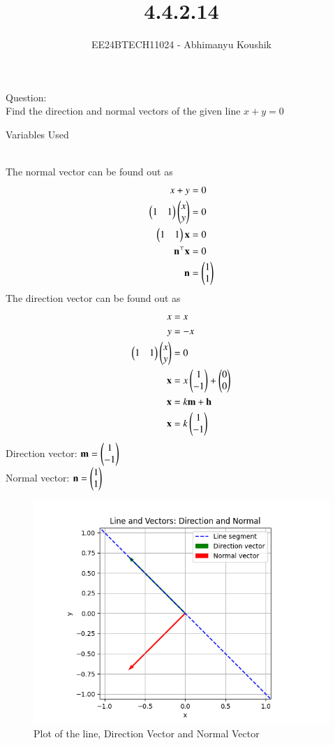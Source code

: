 \documentclass[journal]{IEEEtran}
\begin{document}

\vspace{3cm}

\title{4.4.2.14}
\author{EE24BTECH11024 - Abhimanyu Koushik}
{\let\newpage\relax\maketitle}
Question:\\
Find the direction and normal vectors of the given line $x+y=0$
\begin{table}[h!]    
  \centering
  
  \caption{Variables Used}
  \label{tab1-1.9-6}
\end{table}\\
\solution
The normal vector can be found out as
\begin{align}
x+y&=0\\
\begin{pmatrix}1 & 1\end{pmatrix}\begin{pmatrix}x\\y\end{pmatrix}&=0\\
\begin{pmatrix}1&1\end{pmatrix}\mathbf{x}&=0\\
\mathbf{n}^\top\mathbf{x}&=0\\
\mathbf{n}&=\begin{pmatrix}1\\1\end{pmatrix}
\end{align}
The direction vector can be found out as
\begin{align}
x&=x\\
y&=-x\\
\begin{pmatrix}1 & 1\end{pmatrix}\begin{pmatrix}x\\y\end{pmatrix}&=0\\
\mathbf{x}&=x\begin{pmatrix}1\\-1\end{pmatrix}+\begin{pmatrix}0\\0\end{pmatrix}\\
\mathbf{x}&=k\mathbf{m}+\mathbf{h}\\
\mathbf{x}&=k\begin{pmatrix}1\\-1\end{pmatrix}
\end{align}
Direction vector: $\mathbf{m}=\begin{pmatrix}1\\-1\end{pmatrix}$\\
Normal vector: $\mathbf{n}=\begin{pmatrix}1\\1\end{pmatrix}$
\begin{figure}[h!]
   \centering
   \includegraphics[width = 1\linewidth]{figs/fig.png}
   \caption{Plot of the line, Direction Vector and Normal Vector}
   \label{stemplot}
\end{figure}
\end{document}
